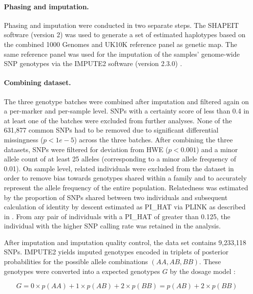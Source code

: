 \paragraph{Phasing and imputation.} Phasing and imputation were conducted in two separate steps. The SHAPEIT software (version 2) \citep{Delaneau2012,Delaneau2013} was used to generate a set of estimated haplotypes based on the combined 1000 Genomes \citep{Abecasis2012} and UK10K \citep{UK10KConsortium2014} reference panel as genetic map. The same reference panel was used for the imputation of the samples’ genome-wide SNP genotypes via the IMPUTE2 software (version 2.3.0) \citep{Marchini2007, Howie2009}. 
\paragraph{Combining dataset.} The three genotype batches were combined after imputation and filtered again on a per-marker and per-sample level. SNPs with a certainty score of less than 0.4 in at least one of the batches were excluded from further analyses. None of the 631,877 common SNPs had to be removed due to significant differential missingness (\(p < 1e-5\)) across the three batches. After combining the three datasets, SNPs were filtered for deviation from HWE (\(p <0.001\)) and a minor allele count of at least 25 alleles (corresponding to a minor allele frequency of 0.01).  On sample level, related individuals were excluded from the dataset in order to remove bias towards genotypes shared within a family and to accurately represent the allele frequency of the entire population. Relatedness was estimated by the proportion of SNPs shared between two individuals and subsequent calculation of identity by descent estimated as PI\_HAT via PLINK as described in \citep{Anderson2010}. From any pair of individuals with a PI\_HAT of greater than 0.125, the individual with the higher SNP calling rate was retained in the analysis. 

After imputation and imputation quality control, the data set contains 9,233,118 SNPs. IMPUTE2 yields imputed genotypes encoded in triplets of posterior probabilities for the possible allele combinations \((AA, AB, BB)\). These genotypes were converted into a expected genotypes \(G\) by the dosage model \citep{Howie2011}:

\begin{equation}
	G = 0 \times p(AA) + 1 \times p(AB) + 2 \times p(BB) = p(AB) + 2 \times p(BB)
\end{equation}

